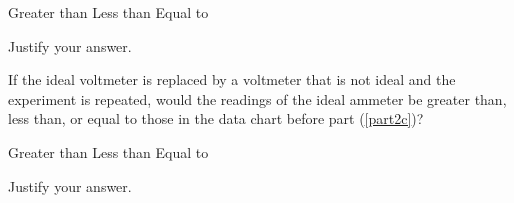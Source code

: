 \documentclass{../../oss-apphys-exam}
\begin{document}
\begin{questions}
\begin{parts}
\begin{subparts}
      \vspace{.2in}
      \underline{\hspace{.4in}} Greater than\hspace{.5in}
      \underline{\hspace{.4in}} Less than\hspace{.5in}
      \underline{\hspace{.4in}} Equal to
      
      \vspace{.1in}Justify your answer.
      \vspace{\stretch1}
      
      \subpart If the ideal voltmeter is replaced by a voltmeter that is not
      ideal and the experiment is repeated, would the readings of the ideal
      ammeter be greater than, less than, or equal to those in the data chart
      before part (\ref{part2c})?

      \vspace{.2in}
      \underline{\hspace{.4in}} Greater than\hspace{.5in}
      \underline{\hspace{.4in}} Less than\hspace{.5in}
      \underline{\hspace{.4in}} Equal to

      \vspace{.1in}Justify your answer.
      \vspace{\stretch1}
    \end{subparts}
  \end{parts}
\end{questions}
\end{document}
